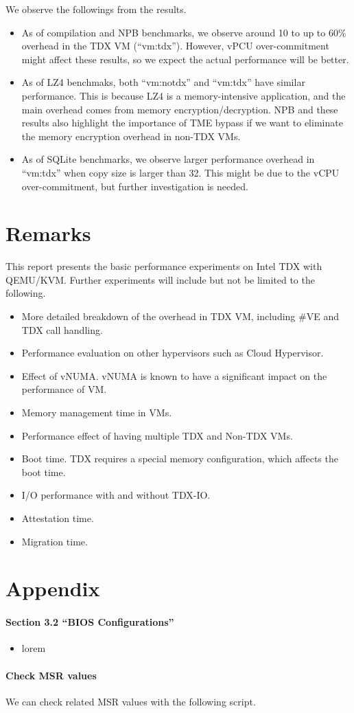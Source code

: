 \documentclass[letterpaper,twocolumn,10pt]{article}
\newcommand{\myparagraph}{\paragraph}
\begin{document}
We observe the followings from the results.
\begin{itemize}
    \item As of compilation and NPB benchmarks, we observe around 10 to up to 60\% overhead in the TDX VM (``vm:tdx''). However, vPCU over-commitment might affect these results, so we expect the actual performance will be better.
    \item As of LZ4 benchmaks, both ``vm:notdx'' and ``vm:tdx'' have similar performance. This is because LZ4 is a memory-intensive application, and the main overhead comes from memory encryption/decryption. NPB and these results also highlight the importance of TME bypass if we want to eliminate the memory encryption overhead in non-TDX VMs.
    \item As of SQLite benchmarks, we observe larger performance overhead in ``vm:tdx'' when copy size is larger than 32. This might be due to the vCPU over-commitment, but further investigation is needed.
\end{itemize}

\section{Remarks}
This report presents the basic performance experiments on Intel TDX with QEMU/KVM.
Further experiments will include but not be limited to the following.

\begin{itemize}
    \item More detailed breakdown of the overhead in TDX VM, including \#VE and TDX call handling.
    \item Performance evaluation on other hypervisors such as Cloud Hypervisor.
    \item Effect of vNUMA. vNUMA is known to have a significant impact on the performance of VM.
    \item Memory management time in VMs.
    \item Performance effect of having multiple TDX and Non-TDX VMs.
    \item Boot time. TDX requires a special memory configuration, which affects the boot time.
    \item I/O performance with and without TDX-IO.
    \item Attestation time.
    \item Migration time.
\end{itemize}

\printbibliography

\appendix
\section*{Appendix}
\myparagraph{Section 3.2 ``BIOS Configurations''}
\begin{itemize}
    \item lorem
\end{itemize}

\myparagraph{Check MSR values}
We can check related MSR values with the following script.

\end{document}
